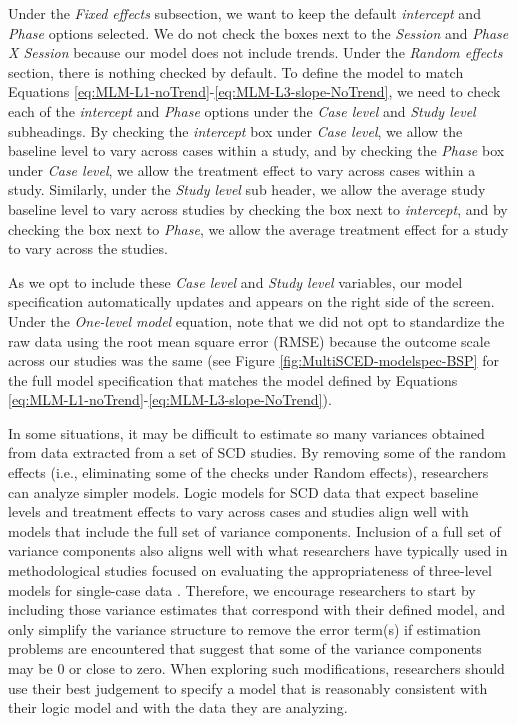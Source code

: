 \documentclass[
]{book}
\begin{document}
Under the \emph{Fixed effects} subsection, we want to keep the default \emph{intercept} and \emph{Phase} options selected. We do not check the boxes next to the \emph{Session} and \emph{Phase X Session} because our model does not include trends. Under the \emph{Random effects} section, there is nothing checked by default. To define the model to match Equations \eqref{eq:MLM-L1-noTrend}-\eqref{eq:MLM-L3-slope-NoTrend}, we need to check each of the \emph{intercept} and \emph{Phase} options under the \emph{Case level} and \emph{Study level} subheadings. By checking the \emph{intercept} box under \emph{Case level}, we allow the baseline level to vary across cases within a study, and by checking the \emph{Phase} box under \emph{Case level}, we allow the treatment effect to vary across cases within a study. Similarly, under the \emph{Study level} sub header, we allow the average study baseline level to vary across studies by checking the box next to \emph{intercept}, and by checking the box next to \emph{Phase}, we allow the average treatment effect for a study to vary across the studies.

As we opt to include these \emph{Case level} and \emph{Study level} variables, our model specification automatically updates and appears on the right side of the screen. Under the \emph{One-level model} equation, note that we did not opt to standardize the raw data using the root mean square error (RMSE) because the outcome scale across our studies was the same (see Figure \ref{fig:MultiSCED-modelspec-BSP} for the full model specification that matches the model defined by Equations \eqref{eq:MLM-L1-noTrend}-\eqref{eq:MLM-L3-slope-NoTrend}).

In some situations, it may be difficult to estimate so many variances obtained from data extracted from a set of SCD studies. By removing some of the random effects (i.e., eliminating some of the checks under Random effects), researchers can analyze simpler models. Logic models for SCD data that expect baseline levels and treatment effects to vary across cases and studies align well with models that include the full set of variance components. Inclusion of a full set of variance components also aligns well with what researchers have typically used in methodological studies focused on evaluating the appropriateness of three-level models for single-case data \citep{Joo_et_al_2019, Moeyaert_Ugille_Ferron_Beretvas_VandenNoortgate_2013, Owens_Ferron_2012}. Therefore, we encourage researchers to start by including those variance estimates that correspond with their defined model, and only simplify the variance structure to remove the error term(s) if estimation problems are encountered that suggest that some of the variance components may be 0 or close to zero. When exploring such modifications, researchers should use their best judgement to specify a model that is reasonably consistent with their logic model and with the data they are analyzing.
\end{document}
